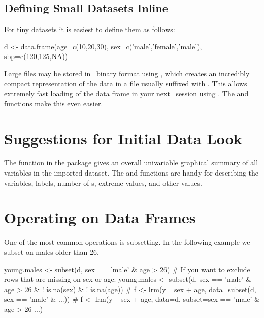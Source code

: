 \subsection{Defining Small Datasets Inline}
For tiny datasets it is easiest to define them as follows:
\begin{Schunk}
\begin{Sinput}
d <- data.frame(age=c(10,20,30), sex=c('male','female','male'),
                sbp=c(120,125,NA))
\end{Sinput}
\end{Schunk}

Large files may be stored in \R\ binary format using , which creates an incredibly compact representation
of the data in a file usually suffixed with .  This allows
extremely fast loading of the data frame in your next \R\ session
using .  The   and 
functions make this even easier.

\section{Suggestions for Initial Data Look}
The  function in the  package gives an
overall univariable graphical summary of all variables in the imported
dataset.  The  and  functions are handy for
describing the variables, labels, number of s, extreme values,
and other values.

\section{Operating on Data Frames}
One of the most common operations is subsetting.  In the following
example we subset on males older than 26.
\begin{Schunk}
\begin{Sinput}
young.males <- subset(d, sex == 'male' & age > 26)
# If you want to exclude rows that are missing on sex or age:
young.males <- subset(d, sex == 'male' & age > 26 & ! is.na(sex) &
                        ! is.na(age))
# f <- lrm(y ~ sex + age, data=subset(d, sex == 'male' & ...))
# f <- lrm(y ~ sex + age, data=d, subset=sex == 'male' & age > 26 ...)
\end{Sinput}
\end{Schunk}
